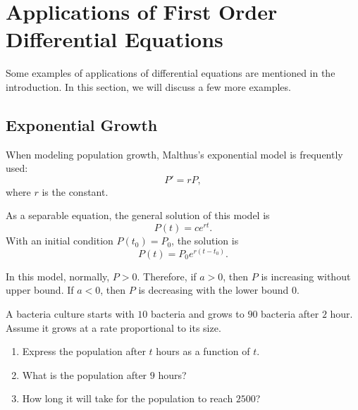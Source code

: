 \section{Applications of First Order Differential Equations}

Some examples of applications of differential equations are mentioned in the introduction. In this section, we will discuss a few more examples.

\subsection{Exponential Growth}

When modeling population growth, Malthus's exponential model is frequently used:
\[P'=rP,\]
where $r$ is the constant.

As a separable equation, the general solution of this model is
\[P(t)=ce^{rt}.\]
With an initial condition $P(t_0)=P_0$, the solution is
\[P(t)=P_0e^{r(t-t_0)}.\]

In this model, normally, $P>0$. Therefore, if $a>0$, then $P$ is increasing without upper bound. If $a<0$, then $P$ is decreasing with the lower bound 0.

\begin{example}
	A bacteria culture starts with $10$ bacteria and grows to $90$ bacteria after $2$ hour.  Assume it grows at a rate proportional to its size.
	\begin{enumerate}
		\item Express the population after $t$ hours as a function of $t$.
		\item What is the population after $9$ hours?
		\item How long it will take for the population to reach $2500$?
	\end{enumerate}
\end{example}

